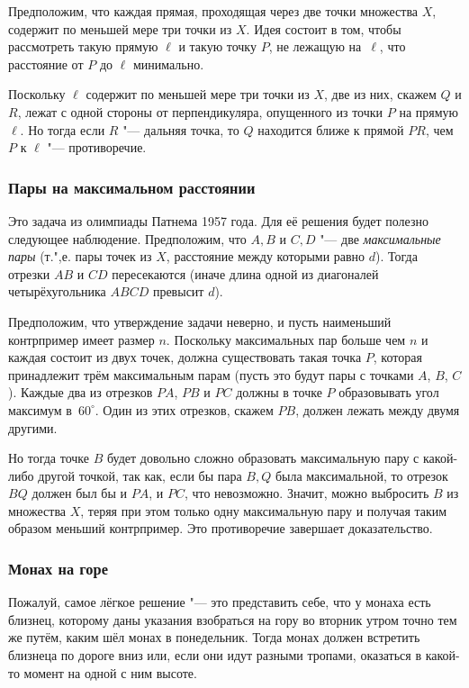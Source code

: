 \documentclass[twoside]{book}
\begin{document}
Предположим, что каждая прямая, проходящая через две точки множества $X$, содержит по меньшей мере три точки из $X$.
Идея состоит в том, чтобы рассмотреть такую прямую $\ell$ и такую точку $P$, не лежащую на~$\ell$, что расстояние от $P$ до $\ell$ минимально.

Поскольку $\ell$ содержит по меньшей мере три точки из $X$, две из них, скажем $Q$ и $R$, лежат с одной стороны от перпендикуляра, опущенного из точки $P$ на прямую $\ell$.
Но тогда если $R$ "--- дальняя точка, то $Q$ находится ближе к прямой $PR$, чем $P$ к $\ell$ "--- противоречие.\heart

\subsubsection*{Пары на максимальном расстоянии}%

Это задача из олимпиады Патнема 1957 года.
Для её решения будет полезно следующее наблюдение.
Предположим, что $A,B$ и $C,D$ "--- две \emph{максимальные пары} (т.",е. пары точек из $X$, расстояние между которыми равно $d$).
Тогда отрезки $AB$ и $CD$ пересекаются (иначе длина одной из диагоналей четырёхугольника $ABCD$ превысит $d$).

Предположим, что утверждение задачи неверно, и пусть наименьший контрпример имеет размер $n$.
Поскольку максимальных пар больше чем $n$ и каждая состоит из двух точек,  должна существовать такая точка $P$, которая принадлежит трём максимальным парам (пусть это будут пары с точками $A$, $B$, $C$).
Каждые два из отрезков $PA$, $PB$ и $PC$ должны в точке $P$ образовывать угол максимум в~$60^\circ$.
Один из этих отрезков, скажем $PB$, %
должен лежать между двумя другими.

Но тогда точке $B$ будет довольно сложно образовать максимальную пару с какой-либо другой точкой, так как, если бы пара $B,Q$ была максимальной, то отрезок $BQ$ должен был бы  и $PA$, и $PC$, что невозможно.
Значит, можно выбросить $B$ из множества $X$, теряя при этом только одну максимальную пару и получая таким образом меньший контрпример.
Это противоречие завершает доказательство.\heart

\subsubsection*{Монах на горе}%

Пожалуй, самое лёгкое решение "--- это представить себе, что у монаха есть близнец, которому даны указания взобраться на гору во вторник утром точно тем же путём, каким шёл монах в понедельник.
Тогда монах должен встретить близнеца по дороге вниз или, если они идут разными тропами, оказаться в какой-то момент на одной с ним высоте.\heart
\end{document}
